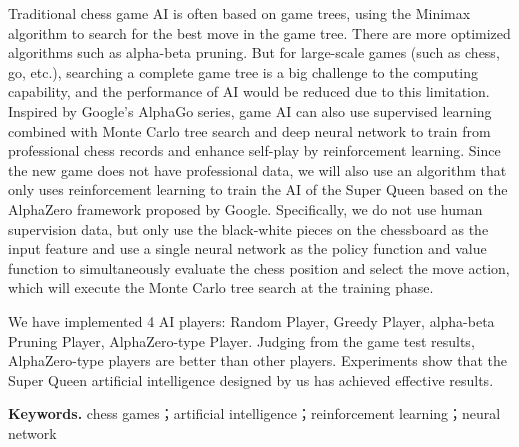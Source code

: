 Traditional chess game AI is often based on game trees, using the Minimax algorithm to search for the best move in the game tree. There are more optimized algorithms such as alpha-beta pruning. But for large-scale games (such as chess, go, etc.), searching a complete game tree is a big challenge to the computing capability, and the performance of AI would be reduced due to this limitation. Inspired by Google's AlphaGo series, game AI can also use supervised learning combined with Monte Carlo tree search and deep neural network to train from professional chess records and enhance self-play by reinforcement learning. Since the new game does not have professional data, we will also use an algorithm that only uses reinforcement learning to train the AI of the Super Queen based on the AlphaZero framework proposed by Google. Specifically, we do not use human supervision data, but only use the black-white pieces on the chessboard as the input feature and use a single neural network as the policy function and value function to simultaneously evaluate the chess position and select the move action, which will execute the Monte Carlo tree search at the training phase.


We have implemented 4 AI players: Random Player, Greedy Player, alpha-beta Pruning Player, AlphaZero-type Player. Judging from the game test results, AlphaZero-type players are better than other players. Experiments show that the Super Queen artificial intelligence designed by us has achieved effective results.

\noindent\textbf{Keywords.} chess games；artificial intelligence；reinforcement learning；neural network